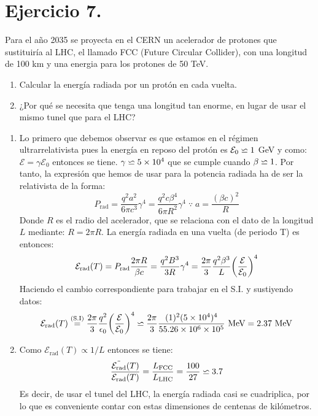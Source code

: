 \documentclass[11pt]{article}
\newcommand{\Prad}{P_\textrm{rad}}
\newcommand{\E}{\mathcal{E}}
\newcommand{\Erad}{\E_\text{rad}}
\begin{document}
\section*{Ejercicio 7.}
Para el año 2035 se proyecta en el CERN un acelerador de protones
que sustituiría al LHC, el llamado FCC (Future Circular Collider), con
una longitud de 100 km y una energia para los protones de 50 TeV.
\begin{enumerate}[label=\roman*)]
    \item Calcular la energía radiada por un protón en cada vuelta.
    \item ¿Por qué se necesita que tenga una longitud tan enorme, en lugar de usar
    el mismo tunel que para el LHC? 
\end{enumerate}
\Resolucion
 \begin{enumerate}[label=\roman*)]
    \item Lo primero que debemos observar es que estamos en el régimen ultrarrelativista pues la energía en reposo del protón es $\E_0 \appeq 1$ GeV y como: $\E = \gamma \E_0$ entonces se tiene. $\gamma \backsimeq 5\times 10^4$ que se cumple cuando $\beta \backsimeq 1$. Por tanto, la expresión que hemos de usar para la potencia radiada ha de ser la relativista de la forma: 
    \begin{equation}
        \Prad = \dfrac{q^2 a^2}{6\pi c^3}\gamma^4 = \dfrac{q^2 c\beta^4 }{6\pi R^2}\gamma^4 \;\because\; a = \dfrac{(\beta c)^2}{R}
    \end{equation} 
    Donde $R$ es el radio del acelerador, que se relaciona con el dato  de la longitud $L$ mediante: $R = 2\pi R$. La energía radiada en una vuelta (de periodo T) es entonces: 
    \begin{equation}
        \Erad(T) = \Prad \dfrac{2\pi R}{\beta c} = \dfrac{q^2 B^3}{3 R}\gamma^4 = \dfrac{2\pi}{3}\dfrac{q^2\beta^3}{L}\qty(\dfrac{\E}{\E_0})^4
    \end{equation}
    Haciendo el cambio correspondiente para trabajar en el S.I. y sustiyendo datos: 
    \begin{equation}
        \Erad(T) \overset{\text{(S.I)}}{=} \dfrac{2\pi}{3}\dfrac{q^2}{\epsilon_0}\qty(\dfrac{\E}{\E_0})^4 \appeq \dfrac{2\pi}{3}\dfrac{(1)^2(5\times 10^4)^4}{55.26\times 10^6 \times 10^5}\text{ MeV} = 2.37\text{ MeV}
    \end{equation}
    \item Como $\Erad(T) \propto 1/L$ entonces se tiene: 
    \begin{equation}
        \dfrac{\tilde{\Erad}(T)}{\Erad(T)} = \dfrac{L_\text{FCC}}{L_\text{LHC}} = \dfrac{100}{27} \appeq 3.7
    \end{equation}
    Es decir, de usar el tunel del LHC, la energía radiada casi se cuadriplica, por lo que es conveniente contar con estas dimensiones de centenas de kilómetros. 
 \end{enumerate}
\end{document}
